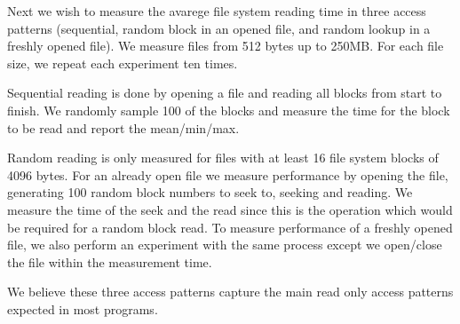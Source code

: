 Next we wish to measure the avarege file system reading time in three access patterns (sequential, random block in an opened file, and random lookup in a freshly opened file).
We measure files from 512 bytes up to 250MB.
For each file size, we repeat each experiment ten times.

Sequential reading is done by opening a file and reading all blocks from start to finish.  We randomly sample 100 of the blocks and measure the time for the block to be read and report the mean/min/max.

Random reading is only measured for files with at least 16 file system blocks of 4096 bytes.
For an already open file we measure performance by opening the file, generating 100 random block numbers to seek to, seeking and reading.
We measure the time of the seek and the read since this is the operation which would be required for a random block read.
To measure performance of a freshly opened file, we also perform an experiment with the same process except we open/close the file within the measurement time.

We believe these three access patterns capture the main read only access patterns expected in most programs.

